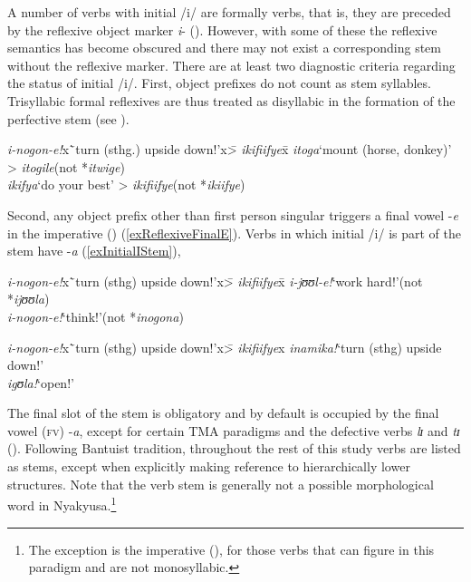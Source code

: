 A number of verbs with initial /i/ are formally  verbs, that is, they are preceded by the reflexive object marker \textit{i}- (). However, with some of these the reflexive semantics has become obscured and there may not exist a corresponding stem without the reflexive marker. There are at least two diagnostic criteria regarding the status of initial /i/. First, object prefixes do not count as stem syllables. Trisyllabic formal reflexives are thus treated as disyllabic in the formation of the perfective stem (see ).
\begin{exe}
	\ex
	\begin{tabbing}
		\textit{i-nogon-e!}x\=`turn (sthg.) upside down!'x\= > \textit{ikifiifye}x\=\kill
		\textit{itoga}\>`mount (horse, donkey)'\> > \textit{itogile}\>(not *\textit{itwige})\\
		\textit{ikifya}\>`do your best'\> > \textit{ikifiifye}\>(not *\textit{ikiifye})
	\end{tabbing}
\end{exe}

Second, any object prefix other than first person singular triggers a final vowel -\textit{e} in the imperative () (\ref{exReflexiveFinalE}). Verbs in which initial /i/ is part of the stem have -\textit{a} (\ref{exInitialIStem}),
\begin{exe}
	\ex\label{exReflexiveFinalE}
	\begin{tabbing}
		\textit{i-nogon-e!}x\=`turn (sthg) upside down!'x\= > \textit{ikifiifye}x\=\kill
		\textit{i-jʊʊl-e!}\>`work hard!'\>(not *\textit{ijʊʊla})\\
		\textit{i-nogon-e!}\>`think!'\>(not *\textit{inogona})
	\end{tabbing} 
	\ex\label{exInitialIStem}
	\begin{tabbing}
		\textit{i-nogon-e!}x\=`turn (sthg) upside down!'x\=> \textit{ikifiifye}x\kill
		\textit{inamika!}\>`turn (sthg) upside down!'\\
		\textit{igʊla!}\>`open!'
	\end{tabbing}
\end{exe}

The final slot of the stem is obligatory and by default is occupied by the final vowel (\textsc{fv}) -\textit{a}, except for certain TMA paradigms and the defective verbs \textit{lɪ} and \textit{tɪ} (). Following Bantuist tradition, throughout the rest of this study verbs are listed as stems, except when explicitly making reference to hierarchically lower structures. Note that the verb stem is generally not a possible morphological word in Nyakyusa.\footnote{The exception is the imperative (), for those verbs that can figure in this paradigm and are not monosyllabic.}
